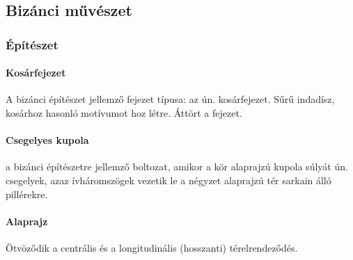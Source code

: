 \subsection*{Bizánci művészet}

\subsubsection{Építészet}

	\paragraph{Kosárfejezet}
	A bizánci építészet jellemző fejezet típusa: az ún. kosárfejezet. Sűrű indadísz, kosárhoz hasonló motívumot hoz létre. Áttört a fejezet.
	
	\paragraph{Csegelyes kupola}
	a bizánci építészetre jellemző boltozat, amikor a kör alaprajzú kupola súlyát ún. csegelyek, azaz ívháromszögek vezetik le a négyzet alaprajzú tér sarkain álló pillérekre.
	
	\begin{figure}[H]
		\centering
		\begin{minipage}{0.45\textwidth}
		\end{minipage}
		\hfill
		\begin{minipage}{0.42\textwidth}
			
		\end{minipage}
	\end{figure}
	
	\paragraph{Alaprajz}
	Ötvöződik a centrális és a longitudinális (hosszanti) térelrendeződés.
	

